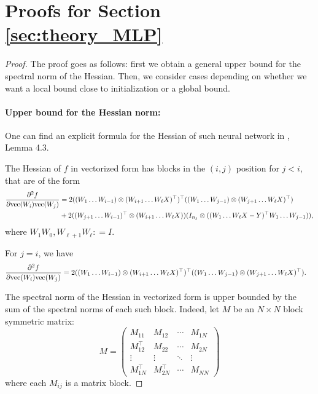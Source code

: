 \documentclass[a4paper,11pt]{article}
\newcommand{\1}{\mathbbm{1}}
\theoremstyle{plain}
\begin{document}
\section{Proofs for Section \ref{sec:theory_MLP}}
\label{app:proofs_neural_nets}

\thmdeeplinear*



\begin{proof}
The proof goes as follows: first we obtain a general upper bound for the spectral norm of the Hessian. Then, we consider cases depending on whether we want a local bound close to initialization or a global bound.

\paragraph{Upper bound for the Hessian norm:}

    One can find an explicit formula for the Hessian of such neural network in \cite{kawaguchi2016deep}, Lemma 4.3.

    The Hessian of $f$ in vectorized form has blocks in the $(i,j)$ position for $j < i$, that are of the form 
    \begin{align*}
        \frac{\partial^2 f}{\partial \textnormal{vec}(W_i) \textnormal{vec}(W_j)} &= 2((W_1 \dots W_{i-1}) \otimes (W_{i+1} \dots W_{\ell} X)^\top)^\top  ((W_1 \dots W_{j-1}) \otimes (W_{j+1} \dots W_{\ell} X)^\top) \\ & + 2((W_{j+1} \dots W_{i-1})^\top \otimes (W_{i+1} \dots W_{\ell} X)) (I_{n_j} \otimes ((W_1 \dots W_{\ell} X-Y)^\top W_1 \dots W_{j-1} )),
    \end{align*}
where $W_1 W_0, W_{\ell+1} W_{\ell} : = I$. 




For $j=i$, we have
\begin{align*}
        \frac{\partial^2 f}{\partial \textnormal{vec}(W_i) \textnormal{vec}(W_j)} &= 2((W_1 \dots W_{i-1}) \otimes (W_{i+1} \dots W_{\ell} X)^\top)^\top  ((W_1 \dots W_{j-1}) \otimes (W_{j+1} \dots W_{\ell} X)^\top).
\end{align*}



The spectral norm of the Hessian in vectorized form is upper bounded by the sum of the spectral norms of each such block.
Indeed, let $M$ be an $N \times N$ block symmetric matrix:
\[
M = \begin{pmatrix}
M_{11} & M_{12} & \cdots & M_{1N} \\
M_{12}^\top & M_{22} & \cdots & M_{2N} \\
\vdots & \vdots & \ddots & \vdots \\
M_{1N}^\top & M_{2N}^\top & \cdots & M_{NN}
\end{pmatrix}
\]
where each $M_{ij}$ is a matrix block. 


\end{proof}
\end{document}

